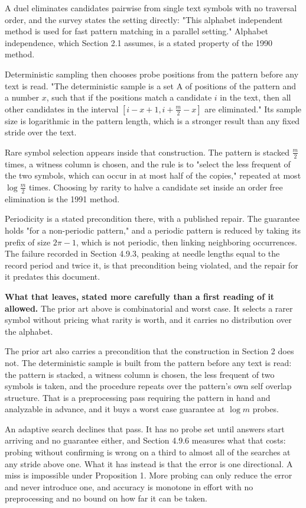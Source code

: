 A duel eliminates candidates pairwise from single text symbols with no traversal order, and the survey states the setting directly: "This alphabet independent method is used for fast pattern matching in a parallel setting." Alphabet independence, which Section 2.1 assumes, is a stated property of the 1990 method.

Deterministic sampling then chooses probe positions from the pattern before any text is read. "The deterministic sample is a set A of positions of the pattern and a number \(x\), such that if the positions match a candidate \(i\) in the text, then all other candidates in the interval \([i-x+1, i+\tfrac{m}{2}-x]\) are eliminated." Its sample size is logarithmic in the pattern length, which is a stronger result than any fixed stride over the text.

Rare symbol selection appears inside that construction. The pattern is stacked \(\tfrac{m}{2}\) times, a witness column is chosen, and the rule is to "select the less frequent of the two symbols, which can occur in at most half of the copies," repeated at most \(\log \tfrac{m}{2}\) times. Choosing by rarity to halve a candidate set inside an order free elimination is the 1991 method.

Periodicity is a stated precondition there, with a published repair. The guarantee holds "for a non-periodic pattern," and a periodic pattern is reduced by taking its prefix of size \(2\pi-1\), which is not periodic, then linking neighboring occurrences. The failure recorded in Section 4.9.3, peaking at needle lengths equal to the record period and twice it, is that precondition being violated, and the repair for it predates this document.

\noindent\textbf{What that leaves, stated more carefully than a first reading of it allowed.} The prior art above is combinatorial and worst case. It selects a rarer symbol without pricing what rarity is worth, and it carries no distribution over the alphabet.

The prior art also carries a precondition that the construction in Section 2 does not. The deterministic sample is built from the pattern before any text is read: the pattern is stacked, a witness column is chosen, the less frequent of two symbols is taken, and the procedure repeats over the pattern's own self overlap structure. That is a preprocessing pass requiring the pattern in hand and analyzable in advance, and it buys a worst case guarantee at \(\log m\) probes.

An adaptive search declines that pass. It has no probe set until answers start arriving and no guarantee either, and Section 4.9.6 measures what that costs: probing without confirming is wrong on a third to almost all of the searches at any stride above one. What it has instead is that the error is one directional. A miss is impossible under Proposition 1. More probing can only reduce the error and never introduce one, and accuracy is monotone in effort with no preprocessing and no bound on how far it can be taken.


